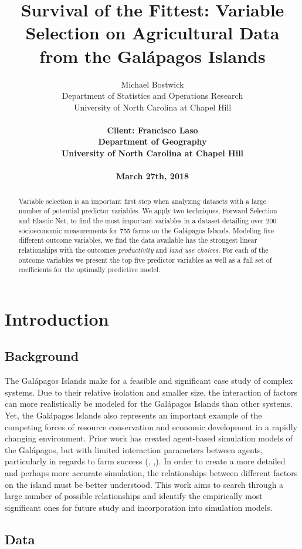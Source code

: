 \documentclass{article}
\title{Survival of the Fittest: Variable Selection on Agricultural Data from the Gal\'apagos Islands}
\author{
  Michael Bostwick\\
  Department of Statistics and Operations Research\\
  University of North Carolina at Chapel Hill\\
	\\
  \bf{Client: Francisco Laso} \\
  Department of Geography \\
  University of North Carolina at Chapel Hill\\
  \\
  March 27th, 2018 \\
}
\begin{document}
\maketitle
\begin{abstract}
  Variable selection is an important first step when analyzing datasets with a large number of potential predictor variables. We 
  apply two techniques, Forward Selection and Elastic Net,  to find the most important variables in a dataset detailing over 200 
  socioeconomic measurements for 755 farms on the Gal\'apagos Islands. Modeling five different outcome variables, we find 
  the data available has the strongest linear relationships with the outcomes \textit{productivity} and \textit{land use choices}. For each of 
  the outcome variables we present the top five predictor variables as well as a full set of coefficients for the optimally predictive 
  model.
  \end{abstract}

\section{Introduction}

\subsection{Background}

The Gal\'apagos Islands make for a feasible and significant case study of complex systems. Due to their relative isolation and smaller size, the interaction of factors can more realistically be modeled for the Gal\'apagos Islands than other systems. Yet, the Gal\'apagos Islands also represents an important example of the competing forces of resource conservation and economic development in a rapidly changing environment. Prior work has created agent-based simulation models of the Gal\'apagos, but with limited interaction parameters between agents, particularly in regards to farm success (\cite{miller}, \cite{valdivia},\cite{walsh}). In order to create a more detailed and perhaps more accurate simulation, the relationships between different factors on the island must be better understood. This work aims to search through a large number of possible relationships and identify the empirically most significant ones for future study and incorporation into simulation models. 

\subsection{Data}
\end{document}

